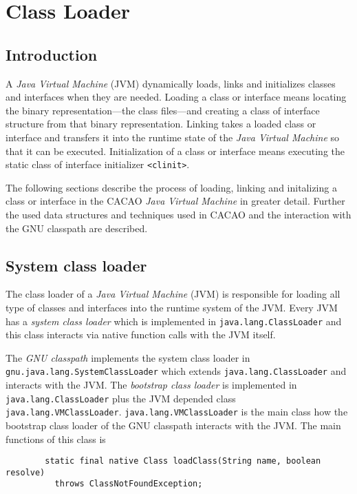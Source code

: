 \chapter{Class Loader}


\section{Introduction}

A \textit{Java Virtual Machine} (JVM) dynamically loads, links and
initializes classes and interfaces when they are needed. Loading a
class or interface means locating the binary representation---the
class files---and creating a class of interface structure from that
binary representation. Linking takes a loaded class or interface and
transfers it into the runtime state of the \textit{Java Virtual
Machine} so that it can be executed. Initialization of a class or
interface means executing the static class of interface initializer
\texttt{<clinit>}.

The following sections describe the process of loading, linking and
initalizing a class or interface in the CACAO \textit{Java Virtual
Machine} in greater detail. Further the used data structures and
techniques used in CACAO and the interaction with the GNU classpath
are described.


\section{System class loader}

The class loader of a \textit{Java Virtual Machine} (JVM) is
responsible for loading all type of classes and interfaces into the
runtime system of the JVM. Every JVM has a \textit{system class
loader} which is implemented in \texttt{java.lang.ClassLoader} and
this class interacts via native function calls with the JVM itself.

The \textit{GNU classpath} implements the system class loader in
\texttt{gnu.java.lang.SystemClassLoader} which extends
\texttt{java.lang.ClassLoader} and interacts with the JVM. The
\textit{bootstrap class loader} is implemented in
\texttt{java.lang.ClassLoader} plus the JVM depended class
\texttt{java.lang.VMClassLoader}. \texttt{java.lang.VMClassLoader} is
the main class how the bootstrap class loader of the GNU classpath
interacts with the JVM. The main functions of this class is

\begin{verbatim}
        static final native Class loadClass(String name, boolean resolve)
          throws ClassNotFoundException;
\end{verbatim}

